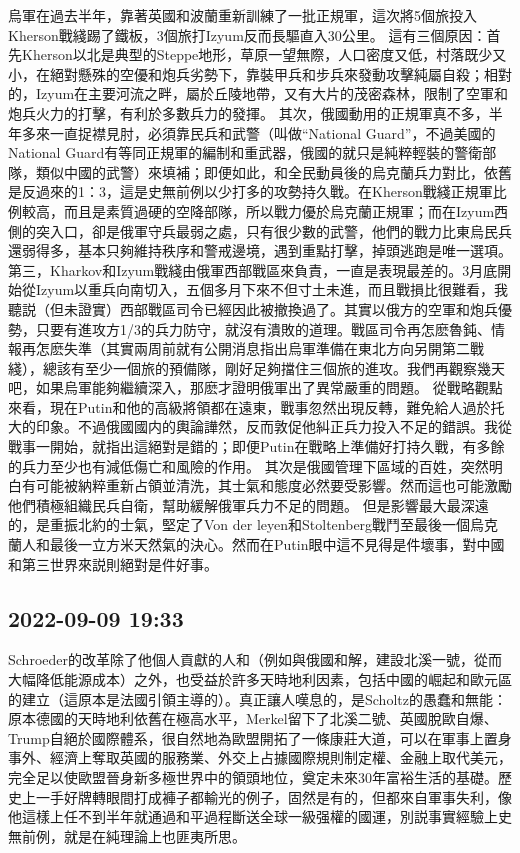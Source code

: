 \documentclass[twocolumn]{ctexart}
\begin{document}
烏軍在過去半年，靠著英國和波蘭重新訓練了一批正規軍，這次將5個旅投入Kherson戰綫踢了鐵板，3個旅打Izyum反而長驅直入30公里。
這有三個原因：首先Kherson以北是典型的Steppe地形，草原一望無際，人口密度又低，村落既少又小，在絕對懸殊的空優和炮兵劣勢下，靠裝甲兵和步兵來發動攻擊純屬自殺；相對的，Izyum在主要河流之畔，屬於丘陵地帶，又有大片的茂密森林，限制了空軍和炮兵火力的打擊，有利於多數兵力的發揮。
其次，俄國動用的正規軍真不多，半年多來一直捉襟見肘，必須靠民兵和武警（叫做“National Guard”，不過美國的National Guard有等同正規軍的編制和重武器，俄國的就只是純粹輕裝的警衛部隊，類似中國的武警）來填補；即便如此，和全民動員後的烏克蘭兵力對比，依舊是反過來的1：3，這是史無前例以少打多的攻勢持久戰。在Kherson戰綫正規軍比例較高，而且是素質過硬的空降部隊，所以戰力優於烏克蘭正規軍；而在Izyum西側的突入口，卻是俄軍守兵最弱之處，只有很少數的武警，他們的戰力比東烏民兵還弱得多，基本只夠維持秩序和警戒邊境，遇到重點打擊，掉頭逃跑是唯一選項。
第三，Kharkov和Izyum戰綫由俄軍西部戰區來負責，一直是表現最差的。3月底開始從Izyum以重兵向南切入，五個多月下來不但寸土未進，而且戰損比很難看，我聽説（但未證實）西部戰區司令已經因此被撤換過了。其實以俄方的空軍和炮兵優勢，只要有進攻方1/3的兵力防守，就沒有潰敗的道理。戰區司令再怎麽魯鈍、情報再怎麽失準（其實兩周前就有公開消息指出烏軍準備在東北方向另開第二戰綫），總該有至少一個旅的預備隊，剛好足夠擋住三個旅的進攻。我們再觀察幾天吧，如果烏軍能夠繼續深入，那麽才證明俄軍出了異常嚴重的問題。
從戰略觀點來看，現在Putin和他的高級將領都在遠東，戰事忽然出現反轉，難免給人過於托大的印象。不過俄國國内的輿論譁然，反而敦促他糾正兵力投入不足的錯誤。我從戰事一開始，就指出這絕對是錯的；即便Putin在戰略上準備好打持久戰，有多餘的兵力至少也有減低傷亡和風險的作用。
其次是俄國管理下區域的百姓，突然明白有可能被納粹重新占領並清洗，其士氣和態度必然要受影響。然而這也可能激勵他們積極組織民兵自衛，幫助緩解俄軍兵力不足的問題。
但是影響最大最深遠的，是重振北約的士氣，堅定了Von der leyen和Stoltenberg戰鬥至最後一個烏克蘭人和最後一立方米天然氣的決心。然而在Putin眼中這不見得是件壞事，對中國和第三世界來説則絕對是件好事。
\subsection*{2022-09-09 19:33}

Schroeder的改革除了他個人貢獻的人和（例如與俄國和解，建設北溪一號，從而大幅降低能源成本）之外，也受益於許多天時地利因素，包括中國的崛起和歐元區的建立（這原本是法國引領主導的）。真正讓人嘆息的，是Scholtz的愚蠢和無能：原本德國的天時地利依舊在極高水平，Merkel留下了北溪二號、英國脫歐自爆、Trump自絕於國際體系，很自然地為歐盟開拓了一條康莊大道，可以在軍事上置身事外、經濟上奪取英國的服務業、外交上占據國際規則制定權、金融上取代美元，完全足以使歐盟晉身新多極世界中的領頭地位，奠定未來30年富裕生活的基礎。歷史上一手好牌轉眼間打成褲子都輸光的例子，固然是有的，但都來自軍事失利，像他這樣上任不到半年就通過和平過程斷送全球一級强權的國運，別説事實經驗上史無前例，就是在純理論上也匪夷所思。
\end{document}

